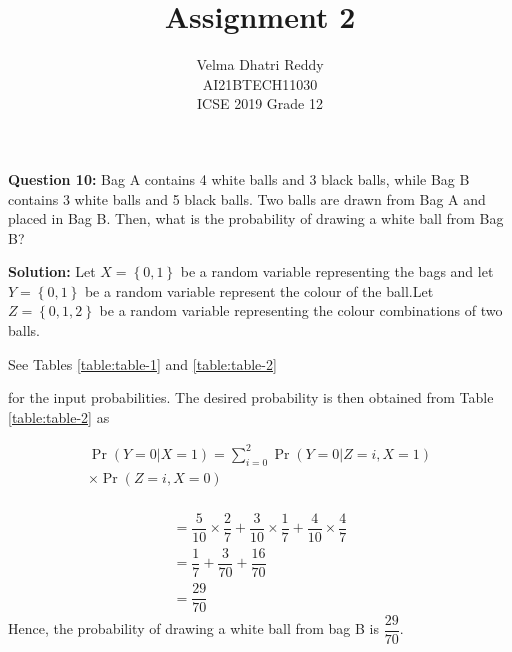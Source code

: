 \documentclass[journal,11pt,twocolumn]{IEEEtran}
\title{Assignment 2}
\author{Velma Dhatri Reddy \\ \normalsize AI21BTECH11030 \\ \vspace*{10pt} \Large ICSE 2019 Grade 12}
\providecommand{\pr}[1]{\ensuremath{\Pr\left(#1\right)}}
\providecommand{\cbrak}[1]{\ensuremath{\left\{#1\right\}}}
\begin{document}
\maketitle
\textbf{Question 10:}
Bag A contains 4 white balls and 3 black balls, while Bag B contains 3 white balls and 5 black balls. Two balls are drawn from Bag A and placed in Bag B. Then, what is the probability of drawing a white ball from Bag B?

\textbf{Solution:} Let $X=\cbrak{0,1}$ be a random variable representing the bags and let $Y=\cbrak{0,1}$ be a random variable represent the colour of the ball.Let $Z=\cbrak{0,1,2}$ be a random variable representing the colour combinations of two balls.

See Tables 
	\eqref{table:table-1}
	and 
	\eqref{table:table-2} 
\begin{table}[ht!]
	
	\vspace*{5pt}
\caption{}
	\label{table:table-1}
\end{table}
\begin{table}[ht!]
	
	\vspace*{5pt}
\caption{}
	\label{table:table-2}
\end{table}
for the input probabilities.
The desired probability is then obtained from Table \eqref{table:table-2} as
	
\begin{multline}
    \pr{Y=0|X=1} = \sum_{i=0}^{2} \pr{Y=0|Z=i,X=1}
    \\
    \times\pr{Z=i,X=0}
    \\
\end{multline}

\begin{align}
    &= \dfrac{5}{10}\times\dfrac{2}{7} + \dfrac{3}{10}\times\dfrac{1}{7} + \dfrac{4}{10}\times\dfrac{4}{7}
    \\
    &= \dfrac{1}{7} + \dfrac{3}{70} + \dfrac{16}{70}
    \\
    &= \dfrac{29}{70} &
\end{align}
Hence, the probability of drawing a white ball from bag B is $\dfrac{29}{70}$.
\end{document}
